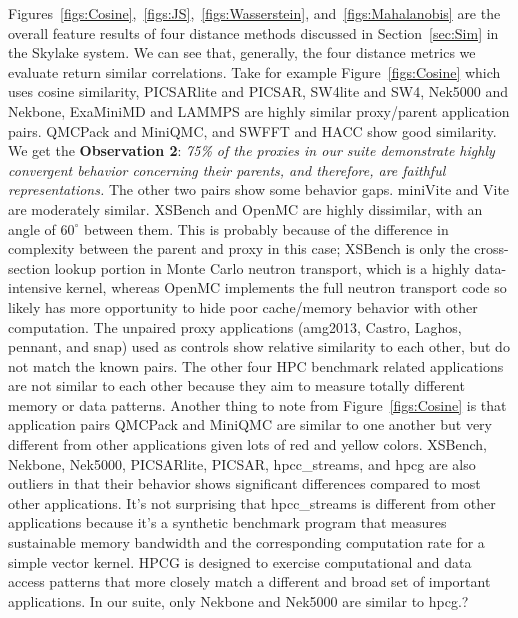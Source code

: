 Figures~\ref{figs:Cosine},~\ref{figs:JS},~\ref{figs:Wasserstein}, and~\ref{figs:Mahalanobis} are the overall feature results of four distance methods discussed in Section~\ref{sec:Sim} in the Skylake system. We can see that, generally, the four distance metrics we evaluate return similar correlations. Take for example Figure~\ref{figs:Cosine} which uses cosine similarity, PICSARlite and PICSAR, SW4lite and SW4, Nek5000 and Nekbone, ExaMiniMD and LAMMPS are highly similar proxy/parent application pairs. QMCPack and MiniQMC, and SWFFT and HACC show good similarity.  We get the \textbf{Observation 2}: \textit{75\% of the proxies in our suite demonstrate highly convergent behavior concerning their parents, and therefore, are faithful representations.} The other two pairs show some behavior gaps. miniVite and Vite are moderately similar. XSBench and OpenMC are highly dissimilar, with an angle of $60^\circ$ between them. This is probably because of the difference in complexity between the parent and proxy in this case; XSBench is only the cross-section lookup portion in Monte Carlo neutron transport, which is a highly data-intensive kernel, whereas OpenMC implements the full neutron transport code so likely has more opportunity to hide poor cache/memory behavior with other computation. The unpaired proxy applications (amg2013, Castro, Laghos, pennant, and snap) used as controls show relative similarity to each other, but do not match the known pairs. The other four HPC benchmark related applications are not similar to each other because they aim to measure totally different memory or data patterns. Another thing to note from Figure~\ref{figs:Cosine} is that application pairs QMCPack and MiniQMC are similar to one another but very different from other applications given lots of red and yellow colors. XSBench, Nekbone, Nek5000, PICSARlite, PICSAR, hpcc\_streams, and hpcg are also outliers in that their behavior shows significant differences compared to most other applications.  It's not surprising that hpcc\_streams is different from other applications because it's a synthetic benchmark program that measures sustainable memory bandwidth and the corresponding computation rate for a simple vector kernel. HPCG is designed to exercise computational and data access patterns that more closely match a different and broad set of important applications. In our suite, only Nekbone and Nek5000 are similar to hpcg.\si{?}

